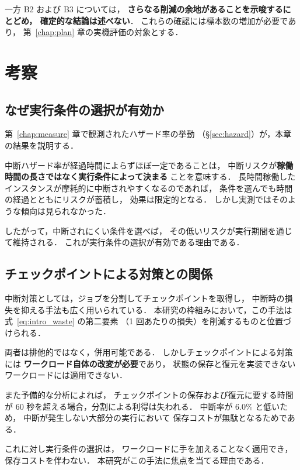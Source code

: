 \documentclass[11pt,a4paper]{ltjsreport}
\begin{document}
一方 B2 および B3 については，
\textbf{さらなる削減の余地があることを示唆するにとどめ，
確定的な結論は述べない}．
これらの確認には標本数の増加が必要であり，
第~\ref{chap:plan} 章の実機評価の対象とする．

\section{考察}

\subsection{なぜ実行条件の選択が有効か}

第~\ref{chap:measure} 章で観測されたハザード率の挙動
（\S\ref{sec:hazard}）が，本章の結果を説明する．

中断ハザード率が経過時間によらずほぼ一定であることは，
中断リスクが\textbf{稼働時間の長さではなく実行条件によって決まる}
ことを意味する．
長時間稼働したインスタンスが摩耗的に中断されやすくなるのであれば，
条件を選んでも時間の経過とともにリスクが蓄積し，
効果は限定的となる．
しかし実測ではそのような傾向は見られなかった．

したがって，中断されにくい条件を選べば，
その低いリスクが実行期間を通じて維持される．
これが実行条件の選択が有効である理由である．

\subsection{チェックポイントによる対策との関係}
\label{sec:checkpoint_discussion}

中断対策としては，ジョブを分割してチェックポイントを取得し，
中断時の損失を抑える手法も広く用いられている．
本研究の枠組みにおいて，この手法は
式~\eqref{eq:intro_waste} の第二要素
（1 回あたりの損失）を削減するものと位置づけられる．

両者は排他的ではなく，併用可能である．
しかしチェックポイントによる対策には
\textbf{ワークロード自体の改変が必要}であり，
状態の保存と復元を実装できないワークロードには適用できない．

また予備的な分析によれば，
チェックポイントの保存および復元に要する時間が
60 秒を超える場合，分割による利得は失われる．
中断率が $6.0\%$ と低いため，
中断が発生しない大部分の実行において
保存コストが無駄となるためである．

これに対し実行条件の選択は，
ワークロードに手を加えることなく適用でき，
保存コストを伴わない．
本研究がこの手法に焦点を当てる理由である．
\end{document}
